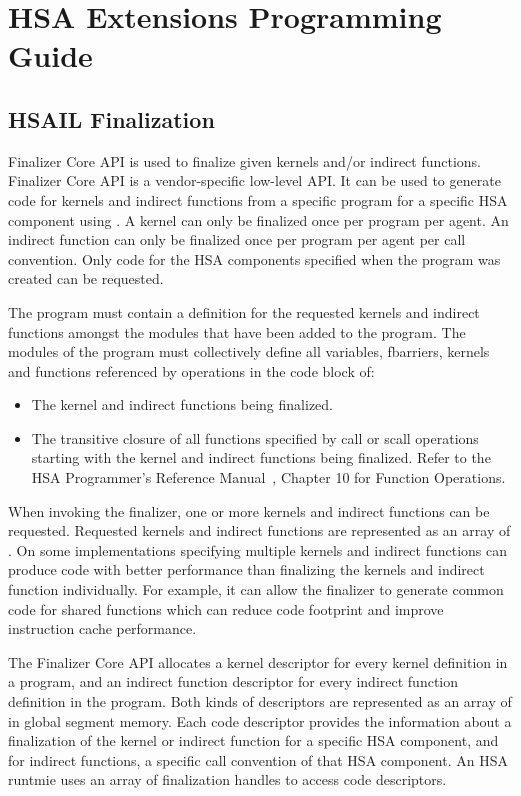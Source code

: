 \documentclass[final]{book}
\begin{document}
\chapter{HSA Extensions Programming Guide}

\section{HSAIL Finalization}\label{sec:finalizer}

Finalizer Core API is used to finalize given kernels and/or indirect functions.
Finalizer Core API is a vendor-specific low-level API. It can be used to
generate code for kernels and indirect functions from a specific program for a
specific HSA component using . A kernel can only be
finalized once per program per agent. An indirect function can only be
finalized once per program per agent per call convention. Only code for the
HSA components specified when the program was created can be requested.

The program must contain a definition for the requested kernels and indirect
functions amongst the modules that have been added to the program. The modules of
the program must collectively define all variables, fbarriers, kernels and functions
referenced by operations in the code block of:
\begin{itemize}
\item{The kernel and indirect functions being finalized.}
\item{The transitive closure of all functions specified by call or scall
operations starting with the kernel and indirect functions being finalized.
Refer to the HSA Programmer's Reference Manual~\cite{prm}, Chapter 10 for
Function Operations.}
\end{itemize}

When invoking the finalizer, one or more kernels and indirect functions can be
requested. Requested kernels and indirect functions are represented as an
array of . On some implementations
specifying multiple kernels and indirect functions can produce code with better
performance than finalizing the kernels and indirect function individually. For
example, it can allow the finalizer to generate common code for shared functions
which can reduce code footprint and improve instruction cache performance.

The Finalizer Core API allocates a kernel descriptor for every kernel definition in a
program, and an indirect function descriptor for every indirect function definition in
the program. Both kinds of descriptors are represented as an array of
 in global segment memory. Each code descriptor
provides the information about a finalization of the kernel or indirect
function for a specific HSA component, and for indirect functions, a specific
call convention of that HSA component. An HSA runtmie uses an array of finalization
handles  to access code descriptors.
\end{document}
